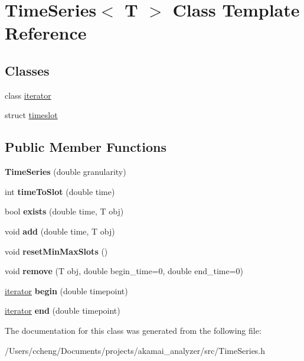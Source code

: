 \hypertarget{class_time_series}{}\section{Time\+Series$<$ T $>$ Class Template Reference}
\label{class_time_series}
\subsection*{Classes}
\begin{DoxyCompactItemize}
\item 
class \mbox{\hyperlink{class_time_series_1_1iterator}{iterator}}
\item 
struct \mbox{\hyperlink{struct_time_series_1_1timeslot}{timeslot}}
\end{DoxyCompactItemize}
\subsection*{Public Member Functions}
\begin{DoxyCompactItemize}
\item 
\mbox{\label{class_time_series_aa2555a043f2e3d6bae3a752001073068}} 
{\bfseries Time\+Series} (double granularity)
\item 
\mbox{\label{class_time_series_ac5f4941233217d3355f4835ca9fd5b1e}} 
int {\bfseries time\+To\+Slot} (double time)
\item 
\mbox{\label{class_time_series_afa51501890d20c04172d09d7fcc794cf}} 
bool {\bfseries exists} (double time, T obj)
\item 
\mbox{\label{class_time_series_a3c91d1dc6f9cd508a6de650709200aa4}} 
void {\bfseries add} (double time, T obj)
\item 
\mbox{\label{class_time_series_a12cce7cc67e03364b64051cf4aadec72}} 
void {\bfseries reset\+Min\+Max\+Slots} ()
\item 
\mbox{\label{class_time_series_a57d69f1af93c7376f6fb9fd6b9cf284c}} 
void {\bfseries remove} (T obj, double begin\+\_\+time=0, double end\+\_\+time=0)
\item 
\mbox{\label{class_time_series_a52a961a7794a2890365e1b7107d5889c}} 
\mbox{\hyperlink{class_time_series_1_1iterator}{iterator}} {\bfseries begin} (double timepoint)
\item 
\mbox{\label{class_time_series_a44ec9bc127afa154573678d9e4b48605}} 
\mbox{\hyperlink{class_time_series_1_1iterator}{iterator}} {\bfseries end} (double timepoint)
\end{DoxyCompactItemize}


The documentation for this class was generated from the following file\+:\begin{DoxyCompactItemize}
\item 
/\+Users/ccheng/\+Documents/projects/akamai\+\_\+analyzer/src/Time\+Series.\+h\end{DoxyCompactItemize}
